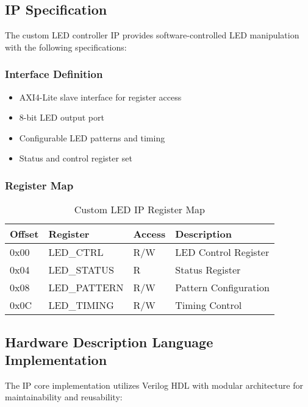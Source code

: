 \documentclass[11pt,a4paper]{article}
\begin{document}
\subsection{IP Specification}

The custom LED controller IP provides software-controlled LED manipulation with the following specifications:

\subsubsection{Interface Definition}
\begin{itemize}[leftmargin=*]
    \item AXI4-Lite slave interface for register access
    \item 8-bit LED output port
    \item Configurable LED patterns and timing
    \item Status and control register set
\end{itemize}

\subsubsection{Register Map}
\begin{table}[H]
    \centering
    \caption{Custom LED IP Register Map}
    \begin{tabular}{@{}llll@{}}
        \toprule
        \textbf{Offset} & \textbf{Register} & \textbf{Access} & \textbf{Description} \\
        \midrule
        0x00 & LED\_CTRL & R/W & LED Control Register \\
        0x04 & LED\_STATUS & R & Status Register \\
        0x08 & LED\_PATTERN & R/W & Pattern Configuration \\
        0x0C & LED\_TIMING & R/W & Timing Control \\
        \bottomrule
    \end{tabular}
    \label{tab:led_ip_registers}
\end{table}
\vspace{2em}
\subsection{Hardware Description Language Implementation}

The IP core implementation utilizes Verilog HDL with modular architecture for maintainability and reusability:
\end{document}
